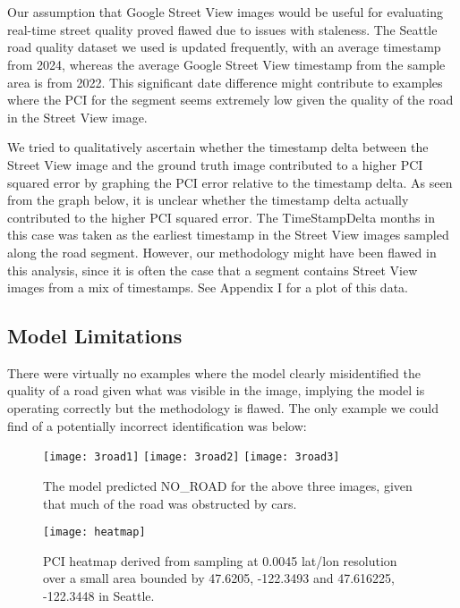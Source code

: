\documentclass{article}
\begin{document}
~\\~\\

Our assumption that Google Street View images would be useful for evaluating real-time street quality proved flawed due to issues with staleness. The Seattle road quality dataset we used is updated frequently, with an average timestamp from 2024, whereas the average Google Street View timestamp from the sample area is from 2022. This significant date difference might contribute to examples where the PCI for the segment seems extremely low given the quality of the road in the Street View image.

We tried to qualitatively ascertain whether the timestamp delta between the Street View image and the ground truth image contributed to a higher PCI squared error by graphing
the PCI error relative to the timestamp delta. As seen from the graph below, it is unclear whether the timestamp delta actually contributed to the higher PCI squared error. The TimeStampDelta months in this case was taken as the earliest timestamp in the Street View images sampled along the road segment. However, our methodology might have been flawed in this analysis,
since it is often the case that a segment contains Street View images from a mix of timestamps. See Appendix I for a plot of this data.


\subsection{Model Limitations}
There were virtually no examples where the model clearly misidentified the quality of a road given what was visible in the image, implying the model is operating correctly but the methodology is flawed. The only example we could find of a potentially incorrect identification was below:

\begin{figure}[ht]
\centering
    {{\texttt{[image: 3road1]} }}%
    {{\texttt{[image: 3road2]} }}%
    {{\texttt{[image: 3road3]} }}%
    \caption{\centering The model predicted NO\_ROAD for the above three images, given that much of the road was obstructed by cars.}%
    \label{fig:example}%
\end{figure}

\begin{figure}[ht]
\centering
    \texttt{[image: heatmap]}
    \caption{\centering PCI heatmap derived from sampling at 0.0045 lat/lon resolution over a small area bounded by 47.6205, -122.3493 and 47.616225, -122.3448 in Seattle.}
    \label{fig:verticalcell}
\end{figure}
\end{document}
